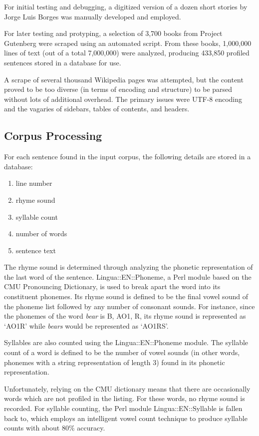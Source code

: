 \documentclass[10pt]{article}
\begin{document}
For initial testing and debugging, a digitized version of a dozen short stories
by Jorge Luis Borges was manually developed and employed.

For later testing and protyping, a selection of 3,700 books from Project
Gutenberg were scraped using an automated script. From these books, 1,000,000
lines of text (out of a total 7,000,000) were analyzed, producing 433,850
profiled sentences stored in a database for use.

A scrape of several thousand Wikipedia pages was attempted, but the content
proved to be too diverse (in terms of encoding and structure) to be parsed
without lots of additional overhead. The primary issues were UTF-8 encoding and
the vagaries of sidebars, tables of contents, and headers.

\subsection{Corpus Processing}
For each sentence found in the input corpus, the following details are stored in a database:
\singlespacing
\begin{enumerate}
\item line number
\item rhyme sound
\item syllable count
\item number of words
\item sentence text
\end{enumerate}
\doublespacing

The rhyme sound is determined through analyzing the phonetic representation of
the last word of the sentence. Lingua::EN::Phoneme, a Perl module based on the
CMU Pronouncing Dictionary, is used to break apart the word into its
constituent phonemes. Its rhyme sound is defined to be the final vowel sound of
the phoneme list followed by any number of consonant sounds. For instance,
since the phonemes of the word \emph{bear} is B, AO1, R, its rhyme sound is
represented as `AO1R' while \emph{bears} would be represented as `AO1RS'.

Syllables are also counted using the Lingua::EN::Phoneme module. The syllable
count of a word is defined to be the number of vowel sounds (in other words,
phonemes with a string representation of length 3) found in its phonetic
representation.

Unfortunately, relying on the CMU dictionary means that there are occasionally
words which are not profiled in the listing. For these words, no rhyme sound is
recorded. For syllable counting, the Perl module Lingua::EN::Syllable is fallen
back to, which employs an intelligent vowel count technique to produce syllable
counts with about 80\% accuracy\cite{syllable}.
\end{document}
